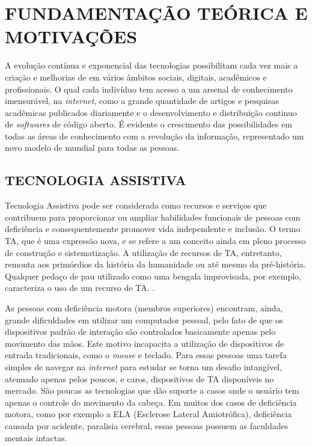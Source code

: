 \chapter{FUNDAMENTAÇÃO TEÓRICA E MOTIVAÇÕES}\label{CAP2}
A evolução contínua e exponencial das tecnologias possibilitam cada vez mais a criação e melhorias de em vários âmbitos sociais, digitais, acadêmicos e profissionais. O qual cada indivíduo tem acesso a um arsenal de conhecimento imensurável, na \textit{internet}, como a grande quantidade de artigos e pesquisas acadêmicas publicados diariamente e o desenvolvimento e distribuição continuo de \textit{softwares} de código aberto. É evidente o crescimento das possibilidades em todas as áreas de conhecimento com a revolução da informação, representado um novo modelo de mundial para todas as pessoas.
% 
% 


\section{TECNOLOGIA ASSISTIVA}\label{Sub:ta-brasil}

Tecnologia Assistiva pode ser considerada como recursos e serviços que contribuem para proporcionar ou ampliar habilidades funcionais de pessoas com deficiência e consequentemente promover vida independente e inclusão. O termo TA, que é uma expressão nova, e se refere a um conceito ainda em pleno processo de construção e sistematização. A utilização de recursos de TA, entretanto, remonta aos primórdios da história da humanidade ou até mesmo da pré-história. Qualquer pedaço de pau utilizado como uma bengala improvisada, por exemplo, caracteriza o uso de um recurso de TA. \cite{galvao2009tecnologia-UPPERCASE}.

As pessoas com deficiência motora (membros superiores) encontram, ainda, grande dificuldades em utilizar um computador pessoal, pelo fato de que os dispositivos padrão de interação são controlados basicamente apenas pelo movimento das mãos. Este motivo incapacita a utilização de dispositivos de entrada tradicionais, como o \textit{mouse} e teclado. Para essas pessoas uma tarefa simples de navegar na \textit{internet} para estudar se torna um desafio intangível, atenuado apenas pelos poucos, e caros, dispositivos de TA disponíveis no mercado. São poucas as tecnologias que dão suporte a casos onde o usuário tem apenas o controle do movimento da cabeça. Em muitos dos casos de deficiência motora, como por exemplo a ELA (Esclerose Lateral Amiotrófica), deficiência causada por acidente, paralisia cerebral, essas pessoas possuem as faculdades mentais intactas.
% 
% 

